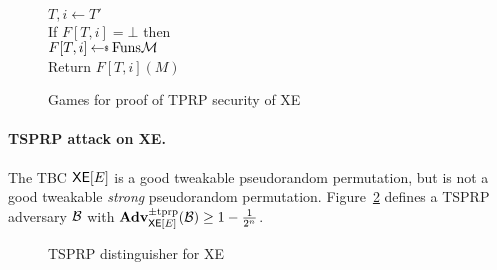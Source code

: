 \begin{figure}[t]
{    \\
    $T,i\gets T'$\\
    If $F[T,i] = \bot$ then\\
    \ind $F[T, i]\getsr\Funs{\msgspace}$\\
    Return $F[T, i](M)$
  }
  \caption{Games for proof of TPRP security of XE}
  \label{fig:xe-tprp-games}
  \end{figure}



\paragraph{TSPRP attack on XE.} The TBC $\mathsf{XE}[E]$ is a good tweakable pseudorandom permutation, but is not a good tweakable \emph{strong} pseudorandom permutation. Figure~\ref{fig:xe-tsprp-dist} defines a TSPRP adversary ${\mathcal B}$ with $\mathbf{Adv}^{\mathrm{\pm tprp}}_{\mathsf{XE}[E]}({\mathcal B}) \geq 1-\frac{1}{2^n}$.

\begin{figure}[h]
\centering
{}
\caption{TSPRP distinguisher for XE}
\label{fig:xe-tsprp-dist}
\end{figure}
\iffalse
\begin{align*}
  M_0 &= D_K(C_0) \oplus E_K(0)\;\; (=\xedec(K, (0, 0), C))\\
  M_1 &= D_K(C_0) \oplus E_K(1)\;\; (=\xedec(K, (1, 0), C))\\
  M_0 \oplus M_1 &= E_K(0) \oplus E_K(1)\\
  \xeenc(K, (1, 0), 0) &= E_K(E_K(1))\\
  \xeenc(K, (0, 0), M_0 \oplus M_1) &= E_K(E_K(0) \oplus M_0 \oplus M_1) = E_K(E_K(0) \oplus E_K(0) \oplus E_K(1)) = E_K(E_K(1))
\end{align*}
\fi

